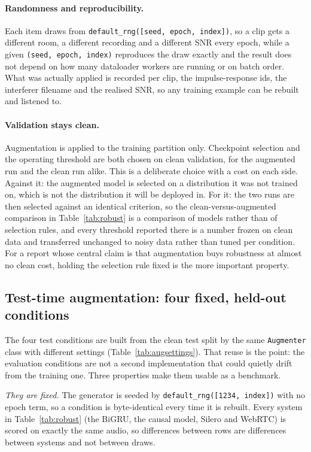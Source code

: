 \documentclass{article}
\begin{document}
\paragraph{Randomness and reproducibility.} Each item draws from \texttt{default\_rng([seed, epoch, index])}, so a clip gets a different room, a different recording and a different SNR every epoch, while a given \texttt{(seed, epoch, index)} reproduces the draw exactly and the result does not depend on how many dataloader workers are running or on batch order. What was actually applied is recorded per clip, the impulse-response ids, the interferer filename and the realised SNR, so any training example can be rebuilt and listened to.

\paragraph{Validation stays clean.} Augmentation is applied to the training partition only. Checkpoint selection and the operating threshold are both chosen on clean validation, for the augmented run and the clean run alike. This is a deliberate choice with a cost on each side. Against it: the augmented model is selected on a distribution it was not trained on, which is not the distribution it will be deployed in. For it: the two runs are then selected against an identical criterion, so the clean-versus-augmented comparison in Table~\ref{tab:robust} is a comparison of models rather than of selection rules, and every threshold reported there is a number frozen on clean data and transferred unchanged to noisy data rather than tuned per condition. For a report whose central claim is that augmentation buys robustness at almost no clean cost, holding the selection rule fixed is the more important property.

\subsection{Test-time augmentation: four fixed, held-out conditions}

The four test conditions are built from the clean test split by the same \texttt{Augmenter} class with different settings (Table~\ref{tab:augsettings}). That reuse is the point: the evaluation conditions are not a second implementation that could quietly drift from the training one. Three properties make them usable as a benchmark.

\emph{They are fixed.} The generator is seeded by \texttt{default\_rng([1234, index])} with no epoch term, so a condition is byte-identical every time it is rebuilt. Every system in Table~\ref{tab:robust} (the BiGRU, the causal model, Silero and WebRTC) is scored on exactly the same audio, so differences between rows are differences between systems and not between draws.
\end{document}
